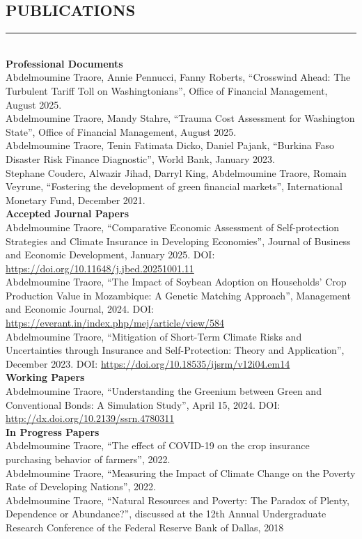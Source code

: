 \documentclass[overlapped]{res}
\begin{document}
\begin{resume}
\section{PUBLICATIONS}
\vspace{-3 mm}
\noindent\rule{\textwidth}{1pt}\\
\textbf{Professional Documents}\\[2 mm]
Abdelmoumine Traore, Annie Pennucci, Fanny Roberts, \enquote{Crosswind Ahead: The Turbulent Tariff Toll on Washingtonians}, Office of Financial Management, August 2025.\\[1.5 mm]
Abdelmoumine Traore, Mandy Stahre, \enquote{Trauma Cost Assessment for Washington State}, Office of Financial Management, August 2025.\\[1.5 mm]
Abdelmoumine Traore, Tenin Fatimata Dicko, Daniel Pajank, \enquote{Burkina Faso Disaster Risk Finance Diagnostic}, World Bank, January 2023.\\[1.5 mm]
Stephane Couderc, Alwazir Jihad, Darryl King, Abdelmoumine Traore, Romain Veyrune, \enquote{Fostering the development of green financial markets}, International Monetary Fund, December 2021.\\[2 mm]
\textbf{Accepted Journal Papers}\\[2 mm]
Abdelmoumine Traore, \enquote{Comparative Economic Assessment of Self-protection Strategies and Climate Insurance in Developing Economies}, Journal of Business and Economic Development, January 2025. DOI: \url{https://doi.org/10.11648/j.jbed.20251001.11}\\[1.5 mm]
Abdelmoumine Traore, \enquote{The Impact of Soybean Adoption on Households’ Crop
Production Value in Mozambique: A Genetic Matching Approach}, Management and Economic Journal, 2024. DOI: \url{https://everant.in/index.php/mej/article/view/584}\\[1.5 mm]
Abdelmoumine Traore, \enquote{Mitigation of Short-Term Climate Risks and Uncertainties through Insurance and Self-Protection: Theory and Application}, December 2023. DOI: \url{https://doi.org/10.18535/ijsrm/v12i04.em14}\\[1.5 mm]
\textbf{Working Papers}\\
Abdelmoumine Traore, \enquote{Understanding the Greenium between Green and Conventional Bonds: A Simulation Study}, April 15, 2024. DOI: \url{http://dx.doi.org/10.2139/ssrn.4780311} \\[1.5 mm]
\textbf{In Progress Papers}\\[2 mm]
Abdelmoumine Traore, \enquote{The effect of COVID-19 on the crop insurance purchasing behavior of farmers}, 2022.\\[1.5 mm]
Abdelmoumine Traore, \enquote{Measuring the Impact of Climate Change on the Poverty Rate of Developing Nations}, 2022.\\[1.5 mm]
Abdelmoumine Traore, \enquote{Natural Resources and Poverty: The Paradox of Plenty, Dependence or Abundance?}, discussed at the 12th Annual Undergraduate Research Conference of the Federal Reserve Bank of Dallas, 2018\\[-6.5 mm]

\end{resume}
\end{document}
